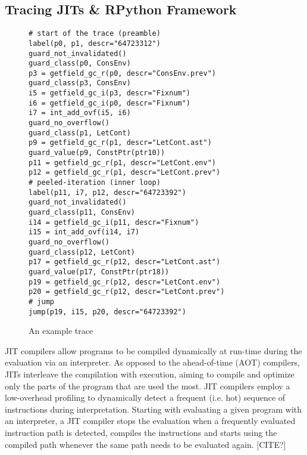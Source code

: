 \subsection{Tracing JITs \& RPython Framework}
\label{subsec:rpython}

  \begin{wrapfigure}[21]{r}{0.35\textwidth}
    \vspace{-0.8cm}
    \centering
    \begin{minipage}[t]{0.32\textwidth}
      \begin{verbatim}
# start of the trace (preamble)
label(p0, p1, descr="64723312")
guard_not_invalidated()
guard_class(p0, ConsEnv)
p3 = getfield_gc_r(p0, descr="ConsEnv.prev")
guard_class(p3, ConsEnv)
i5 = getfield_gc_i(p3, descr="Fixnum")
i6 = getfield_gc_i(p0, descr="Fixnum")
i7 = int_add_ovf(i5, i6)
guard_no_overflow()
guard_class(p1, LetCont)
p9 = getfield_gc_r(p1, descr="LetCont.ast")
guard_value(p9, ConstPtr(ptr10))
p11 = getfield_gc_r(p1, descr="LetCont.env")
p12 = getfield_gc_r(p1, descr="LetCont.prev")
# peeled-iteration (inner loop)
label(p11, i7, p12, descr="64723392")
guard_not_invalidated()
guard_class(p11, ConsEnv)
i14 = getfield_gc_i(p11, descr="Fixnum")
i15 = int_add_ovf(i14, i7)
guard_no_overflow()
guard_class(p12, LetCont)
p17 = getfield_gc_r(p12, descr="LetCont.ast")
guard_value(p17, ConstPtr(ptr18))
p19 = getfield_gc_r(p12, descr="LetCont.env")
p20 = getfield_gc_r(p12, descr="LetCont.prev")
# jump
jump(p19, i15, p20, descr="64723392")

    \end{verbatim}
    \end{minipage}
    \caption{\small An example trace}
    \label{fig:trace}
  \end{wrapfigure}

JIT compilers allow programs to be compiled dynamically at run-time
during the evaluation via an interpreter. As opposed to the
ahead-of-time (AOT) compilers, JITs interleave the compilation with
execution, aiming to compile and optimize only the parts of the
program that are used the most. JIT compilers employ a low-overhead
profiling to dynamically detect a frequent (i.e. hot) sequence of
instructions during interpretation. Starting with evaluating a given
program with an interpreter, a JIT compiler stops the evaluation when
a frequently evaluated instruction path is detected, compiles the
instructions and starts using the compiled path whenever the same path
needs to be evaluated again. [CITE?]

